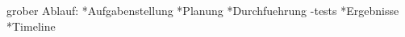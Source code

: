 




\thispagestyle{empty}

\clearpage
{}
\setcounter{page}{1}
\tableofcontents

\clearpage
{}

grober Ablauf:
*Aufgabenstellung
*Planung
*Durchfuehrung
 -tests
*Ergebnisse
*Timeline





